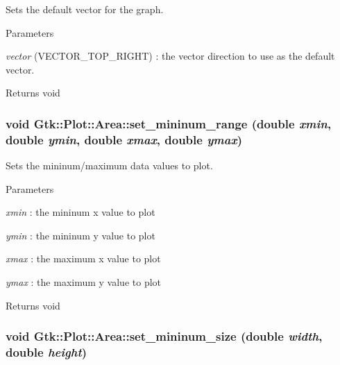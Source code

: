Sets the default vector for the graph. 
\begin{DoxyParams}{Parameters}
\item[{\em vector}](VECTOR\_\-TOP\_\-RIGHT) : the vector direction to use as the default vector. \end{DoxyParams}
\begin{DoxyReturn}{Returns}
void 
\end{DoxyReturn}
\hypertarget{classGtk_1_1Plot_1_1Area_aba18121a1816de00d3ab66c7c380e116}{
\subsubsection[{set\_\-mininum\_\-range}]{\setlength{\rightskip}{0pt plus 5cm}void Gtk::Plot::Area::set\_\-mininum\_\-range (double {\em xmin}, \/  double {\em ymin}, \/  double {\em xmax}, \/  double {\em ymax})}}
\label{classGtk_1_1Plot_1_1Area_aba18121a1816de00d3ab66c7c380e116}


Sets the mininum/maximum data values to plot. 
\begin{DoxyParams}{Parameters}
\item[{\em xmin}]: the mininum x value to plot \item[{\em ymin}]: the mininum y value to plot \item[{\em xmax}]: the maximum x value to plot \item[{\em ymax}]: the maximum y value to plot \end{DoxyParams}
\begin{DoxyReturn}{Returns}
void 
\end{DoxyReturn}
\hypertarget{classGtk_1_1Plot_1_1Area_ad02555415cfec562f6333a54e491806f}{
\subsubsection[{set\_\-mininum\_\-size}]{\setlength{\rightskip}{0pt plus 5cm}void Gtk::Plot::Area::set\_\-mininum\_\-size (double {\em width}, \/  double {\em height})}}
\label{classGtk_1_1Plot_1_1Area_ad02555415cfec562f6333a54e491806f}


